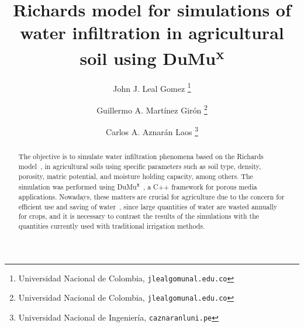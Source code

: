 \documentclass[
	a4paper,
	abstract=true
]
{scrartcl}
\date{}
\title{Richards model for simulations of water infiltration in agricultural soil using DuMu\textsuperscript{x}}
\author{John J. Leal Gomez
	\thanks{
		Universidad Nacional de Colombia,
		\texttt{jlealgom\MVAt unal.edu.co}}
    \and Guillermo A. Martínez Girón
    \thanks{
    Universidad Nacional de Colombia,
		\texttt{jlealgom\MVAt unal.edu.co}}
    \and Carlos A. Aznarán Laos
    \thanks{
      Universidad Nacional de Ingeniería,
		\texttt{caznaranl\MVAt uni.pe}}
}
\begin{document}
\maketitle

\begin{abstract}
	The objective is to simulate water infiltration phenomena based on
	the Richards model~\cite{richards_capillary_1931}, in agricultural
	soils using specific parameters such as soil type, density,
	porosity, matric potential, and moisture holding capacity, among
	others.
	The simulation was performed using
	DuMu\textsuperscript{x}~\cite{Kochetal2020Dumux}, a C++ framework
	for porous media applications.
	Nowadays, these matters are crucial for agriculture due to the
	concern for efficient use and saving of water~\cite{colombia_2021},
	since large quantities of water are wasted annually for crops, and
	it is necessary to contrast the results of the simulations with the
	quantities currently used with traditional irrigation methods.
\end{abstract}


\end{document}
